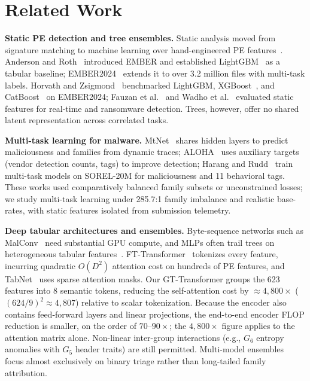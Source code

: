 \documentclass[Number]{sn-jnl}
\begin{document}

\section{Related Work}\label{sec:related}

\noindent\textbf{Static PE detection and tree ensembles.}
Static analysis moved from signature matching to machine learning over hand-engineered PE features~\cite{anderson2018ember,joyce2025ember2024}. Anderson and Roth~\cite{anderson2018ember} introduced EMBER and established LightGBM~\cite{ke2017lightgbm} as a tabular baseline; EMBER2024~\cite{joyce2025ember2024} extends it to over 3.2 million files with multi-task labels. Horvath and Zsigmond~\cite{horvath2026comparative} benchmarked LightGBM, XGBoost~\cite{chen2016xgboost}, and CatBoost~\cite{prokhorenkova2018catboost} on EMBER2024; Fauzan et al.~\cite{fauzan2026large} and Wadho et al.~\cite{wadho2026benchmarking} evaluated static features for real-time and ransomware detection. Trees, however, offer no shared latent representation across correlated tasks.

\noindent\textbf{Multi-task learning for malware.}
MtNet~\cite{huang2016mtnet} shares hidden layers to predict maliciousness and families from dynamic traces; ALOHA~\cite{rudd2019aloha} uses auxiliary targets (vendor detection counts, tags) to improve detection; Harang and Rudd~\cite{harang2020sorel} train multi-task models on SOREL-20M for maliciousness and 11 behavioral tags. These works used comparatively balanced family subsets or unconstrained losses; we study multi-task learning under 285.7:1 family imbalance and realistic base-rates, with static features isolated from submission telemetry.

\noindent\textbf{Deep tabular architectures and ensembles.}
Byte-sequence networks such as MalConv~\cite{raff2018malware} need substantial GPU compute, and MLPs often trail trees on heterogeneous tabular features~\cite{gorishniy2021revisiting,demirkiran2024evaluating}. FT-Transformer~\cite{gorishniy2021revisiting} tokenizes every feature, incurring quadratic $O(D^2)$ attention cost on hundreds of PE features, and TabNet~\cite{arik2021tabnet} uses sparse attention masks. Our GT-Transformer groups the 623 features into 8 semantic tokens, reducing the self-attention cost by $\approx 4{,}800\times$ ($(624/9)^2\approx4{,}807$) relative to scalar tokenization. Because the encoder also contains feed-forward layers and linear projections, the end-to-end encoder FLOP reduction is smaller, on the order of $70$--$90\times$; the $4{,}800\times$ figure applies to the attention matrix alone. Non-linear inter-group interactions (e.g., $G_6$ entropy anomalies with $G_5$ header traits) are still permitted. Multi-model ensembles~\cite{alojaimi2025advanced,alandoli2023ensemble,belal2023global,nazim2024multimodal,kyadige2020learning} focus almost exclusively on binary triage rather than long-tailed family attribution.
\end{document}
